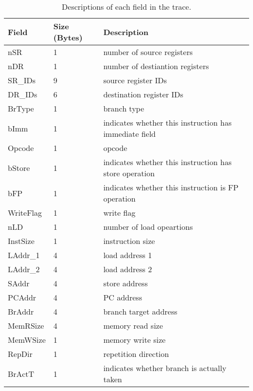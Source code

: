 \begin{table*}[htb]
\begin{footnotesize}
\begin{center}
\caption{Descriptions of each field in the trace.}
\label{table:trace_desc}
\begin{tabular}{|l|l|l|} 
\hline
Field     & Size (Bytes)       & Description \\ \hline 
nSR       & 1                  & number of source registers \\ \hline
nDR       & 1                  & number of destiantion registers \\ \hline
SR\_IDs   & 9                  & source register IDs \\ \hline
DR\_IDs   & 6                  & destination register IDs \\ \hline
BrType    & 1                  & branch type \\ \hline
bImm      & 1                  & indicates whether this instruction has immediate field \\ \hline
Opcode    & 1                  & opcode \\ \hline
bStore    & 1                  & indicates whether this instruction has store operation \\ \hline
bFP       & 1                  & indicates whether this instruction is FP operation \\ \hline
WriteFlag & 1                  & write flag \\ \hline
nLD       & 1                  & number of load opeartions \\ \hline
InstSize  & 1                  & instruction size \\ \hline
LAddr\_1  & 4                  & load address 1 \\ \hline
LAddr\_2  & 4                  & load address 2 \\ \hline
SAddr     & 4                  & store address \\ \hline
PCAddr    & 4                  & PC address \\ \hline
BrAddr    & 4                  & branch target address \\ \hline
MemRSize  & 4                  & memory read size \\ \hline
MemWSize  & 1                  & memory write size \\ \hline
RepDir    & 1                  & repetition direction  \\ \hline
BrActT    & 1                  & indicates whether branch is actually taken \\ \hline

\end{tabular}
\end{center}
\end{footnotesize}
\end{table*}

